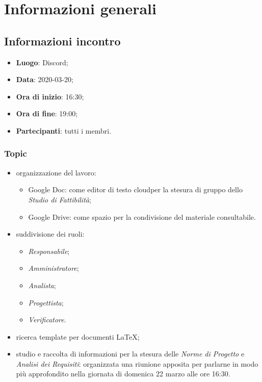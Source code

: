 \section{Informazioni generali}
\subsection{Informazioni incontro}
\begin{itemize}
\item \textbf{Luogo}: Discord\glo;
\item \textbf{Data}: 2020-03-20;
\item \textbf{Ora di inizio}: 16:30;
\item \textbf{Ora di fine}: 19:00;
\item \textbf{Partecipanti}: tutti i membri.
\end{itemize}

\subsubsection{Topic}
\begin{itemize}
\item organizzazione del lavoro:
\begin{itemize}
\item Google Doc: come editor di testo cloud\glo per la stesura di gruppo dello \textit{Studio di Fattibilità};
\item Google Drive: come spazio per la condivisione del materiale consultabile.
\end{itemize}
\item suddivisione dei ruoli: \begin{itemize}
\item \textit{Responsabile};
\item \textit{Amministratore};
\item \textit{Analista};
\item \textit{Progettista};
\item \textit{Verificatore}.
\end{itemize}
\item ricerca template per documenti \LaTeX{};
\item studio e raccolta di informazioni per la stesura delle \textit{Norme di Progetto} e \textit{Analisi dei Requisiti}: organizzata una riunione apposita per parlarne in modo più approfondito nella giornata di domenica 22 marzo alle ore 16:30.
\end{itemize}